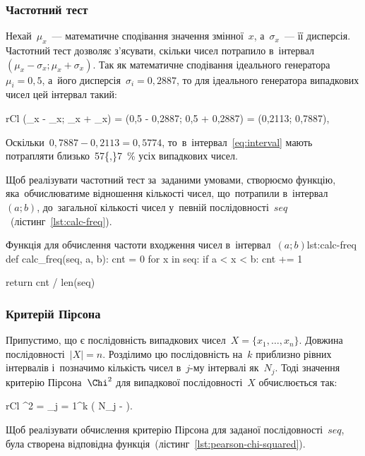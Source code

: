 \documentclass[
	a4paper,
	oneside,
	BCOR = 10mm,
	DIV = 12,
	12pt,
	headings = normal,
]{scrartcl}
\newcommand{\longvar}[1]{\mathit{#1}}
\begin{document}
			\subsubsection{Частотний тест}
			\label{sssec:freq-test}
				Нехай~$\mu_{x}$~— математичне сподівання значення змінної~$x$, а~$\sigma_{x}$~— її дисперсія. Частотний тест дозволяє з'ясувати, скільки чисел потрапило в~інтервал~$(\mu_{x} - \sigma_{x}; \mu_{x} + \sigma_{x})$. Так як математичне сподівання ідеального генератора~$\mu_{i} = 0{,}5$, а~його дисперсія~$\sigma_{i} = 0{,}2887$, то для ідеального генератора випадкових чисел цей інтервал такий:
				\begin{IEEEeqnarray}{rCl}
				\label{eq:interval}
					(\mu_{x} - \sigma_{x}; \mu_{x} + \sigma_{x}) = (0{,}5 - 0{,}2887; 0{,}5 + 0{,}2887) = (0{,}2113; 0{,}7887){,}
				\end{IEEEeqnarray}
				Оскільки~$0{,}7887 - 0{,}2113 = 0{,}5774$, то~в~інтервал~\eqref{eq:interval} мають потрапляти близько~\SI{57{,}7}{\percent} усіх випадкових чисел. 

				Щоб реалізувати частотний тест за~заданими умовами, створюємо функцію, яка~обчислюватиме відношення кількості чисел, що~потрапили в~інтервал~$(a; b)$, до~загальної кількості чисел у~певній послідовності~$\longvar{seq}$~(лістинг~\ref{lst:calc-freq}).

				\begin{listingpython}{Функція для обчислення частоти входження чисел в~інтервал~$(a; b)$}{lst:calc-freq}
def calc_freq(seq, a, b):
    cnt = 0
    for x in seq:
        if a < x < b:
            cnt += 1

    return cnt / len(seq)
				\end{listingpython}

			\subsubsection{Критерій Пірсона}
			\label{sssec:pearson-chi-squared}
				Припустимо, що є послідовність випадкових чисел~$X = \{x_1, \dots, x_{n}\}$. Довжина послідовності~$|X| = n$. Розділимо цю послідовність на~$k$ приблизно рівних інтервалів і~позначимо кількість чисел в~$j$-му інтервалі як~$N_{j}$. Тоді значення критерію Пірсона~$\Chi^{2}$ для випадкової послідовності~$X$ обчислюється так:
				\begin{IEEEeqnarray*}{rCl}
					\Chi^{2} =  \sum_{j = 1}^{k} \left( N_{j} -  \right).
				\end{IEEEeqnarray*}
				Щоб реалізувати обчислення критерію Пірсона для заданої послідовності~$\longvar{seq}$, була створена відповідна функція~(лістинг~\ref{lst:pearson-chi-squared}).
\end{document}
